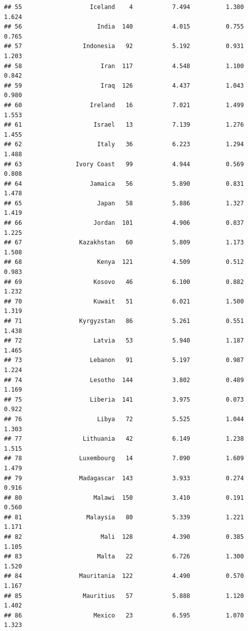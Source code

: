 \documentclass[]{article}
\begin{document}
\begin{verbatim}
## 55                   Iceland    4           7.494          1.380          1.624
## 56                     India  140           4.015          0.755          0.765
## 57                 Indonesia   92           5.192          0.931          1.203
## 58                      Iran  117           4.548          1.100          0.842
## 59                      Iraq  126           4.437          1.043          0.980
## 60                   Ireland   16           7.021          1.499          1.553
## 61                    Israel   13           7.139          1.276          1.455
## 62                     Italy   36           6.223          1.294          1.488
## 63               Ivory Coast   99           4.944          0.569          0.808
## 64                   Jamaica   56           5.890          0.831          1.478
## 65                     Japan   58           5.886          1.327          1.419
## 66                    Jordan  101           4.906          0.837          1.225
## 67                Kazakhstan   60           5.809          1.173          1.508
## 68                     Kenya  121           4.509          0.512          0.983
## 69                    Kosovo   46           6.100          0.882          1.232
## 70                    Kuwait   51           6.021          1.500          1.319
## 71                Kyrgyzstan   86           5.261          0.551          1.438
## 72                    Latvia   53           5.940          1.187          1.465
## 73                   Lebanon   91           5.197          0.987          1.224
## 74                   Lesotho  144           3.802          0.489          1.169
## 75                   Liberia  141           3.975          0.073          0.922
## 76                     Libya   72           5.525          1.044          1.303
## 77                 Lithuania   42           6.149          1.238          1.515
## 78                Luxembourg   14           7.090          1.609          1.479
## 79                Madagascar  143           3.933          0.274          0.916
## 80                    Malawi  150           3.410          0.191          0.560
## 81                  Malaysia   80           5.339          1.221          1.171
## 82                      Mali  128           4.390          0.385          1.105
## 83                     Malta   22           6.726          1.300          1.520
## 84                Mauritania  122           4.490          0.570          1.167
## 85                 Mauritius   57           5.888          1.120          1.402
## 86                    Mexico   23           6.595          1.070          1.323

\end{verbatim}
\end{document}
